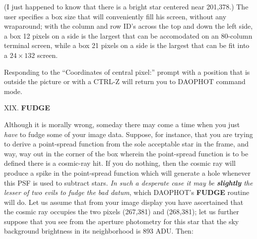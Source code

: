 \noindent (I just happened to know that there is a bright star centered
near 201,378.) The user specifies a box size that will conveniently
fill his screen, without any wraparound; with the column and row ID's
across the top and down the left side, a box 12 pixels on a side is the
largest that can be accomodated on an 80-column terminal screen, while
a box 21 pixels on a side is the largest that can be fit into a $24
\times 132$ screen.

Responding to the ``Coordinates of central pixel:'' prompt with a
position that is outside the picture or with a CTRL-Z will return you
to DAOPHOT command mode.

\vfill
\eject
\noindent XIX.  {\bf FUDGE}

Although it is morally wrong, someday there may come a time when you
just {\it have\/} to fudge some of your image data.  Suppose, for
instance, that you are trying to derive a point-spread function from
the sole acceptable star in the frame, and way, way out in the corner
of the box wherein the point-spread function is to be defined there is
a cosmic-ray hit.  If you do nothing, then the cosmic ray will produce
a spike in the point-spread function which will generate a hole
whenever this PSF is used to subtract stars.  {\it In such a desperate
case it may be {\bf slightly} the lesser of two evils to fudge the bad
datum}, which DAOPHOT's {\bf FUDGE} routine will do.  Let us assume
that from your image display you have ascertained that the cosmic ray
occupies the two pixels (267,381) and (268,381); let us further suppose
that you see from the aperture photometry for this star that the sky
background brightness in its neighborhood is 893 ADU.  Then:

